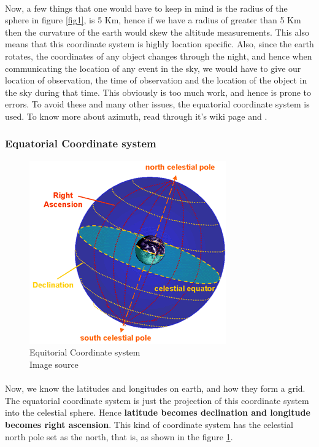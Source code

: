\documentclass[a4paper,twoside]{article}
\numberwithin{equation}{section}
\begin{document}
\paragraph{}
Now, a few things that one would have to keep in mind is the radius of the sphere in figure \ref{fig1}, is 5 Km, hence if we have a radius of greater than 5 Km then the curvature of the earth would skew the altitude measurements. This also means that this coordinate system is highly location specific. Also, since the earth rotates, the coordinates of any object changes through the night, and hence when communicating the location of any event in the sky, we would have to give our location of observation, the time of observation and the location of the object in the sky during that time. This obviously is too much work, and hence is prone to errors. To avoid these and many other issues, the equatorial coordinate system is used. To know more about azimuth, read through it's wiki page \cite{azimuth_wiki} and \cite{coord_wiki}.
\subsubsection{Equatorial Coordinate system}
\begin{figure}
\includegraphics[width=0.9\linewidth]{fig2.png} 
\caption{Equitorial Coordinate system \\ Image source \cite{equi_coord1}}
\label{fig2}
\end{figure}
\paragraph{}
Now, we know the latitudes and longitudes on earth, and how they form a grid. The equatorial coordinate system is just the projection of this coordinate system into the celestial sphere. Hence \textbf{latitude becomes declination and longitude becomes right ascension}. This kind of coordinate system has the celestial north pole set as the north, that is, as shown in the figure \ref{fig2}. 
\end{document}
